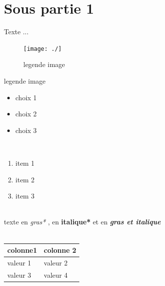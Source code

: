 \documentclass[11pt,fleqn]{book}
\begin{document}
\section{Sous partie 1}
Texte  ...
~\\
\begin{figure}[!t]
\centering
\texttt{[image: ./]}
\caption{legende image}
\label{legende image}
\end{figure}
legende image
~\\
\begin{itemize}
\item choix  1
\item choix  2
\item choix  3
\end{itemize}
~\\
\begin{enumerate}
\item item  1
\item item  2
\item item  3 
\end{enumerate}
~\\
texte  en  \textit{gras*} ,  en  \textbf{italique*} et  en  \textbf{\textit{gras et italique}}
~\\
~\\
\begin{tabular}
{|l|l|}
\hline
colonne1 & colonne 2\\
\hline
valeur  1 & valeur  2\\
valeur  3 & valeur  4\\
\hline
\end{tabular}
~\\
~\\
\end{document}
